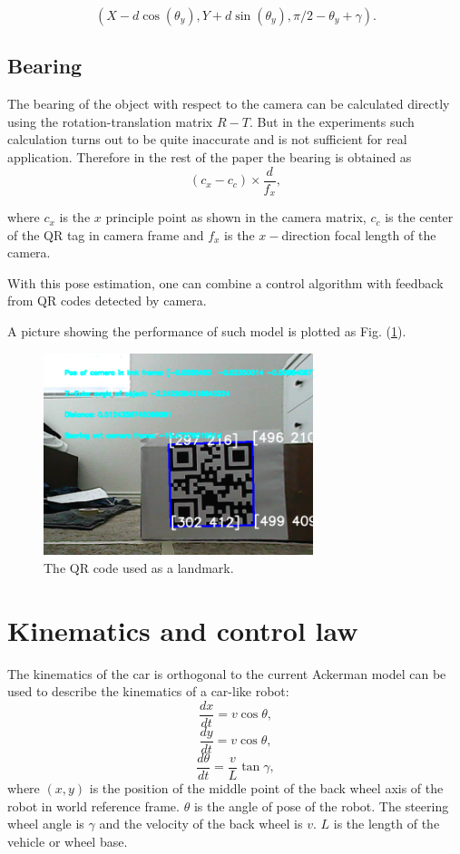 \documentclass[12pt]{article}
\begin{document}
$$(X-d\cos(\theta_y),Y+d\sin(\theta_y),\pi/2-\theta_y+\gamma).$$
\subsection{Bearing}
The bearing of the object with respect to the camera can be calculated directly using the rotation-translation matrix $R-T$. But in the experiments such calculation turns out to be quite inaccurate and is not sufficient for real application. Therefore in the rest of the paper the bearing is obtained as $$(c_x-c_c)\times \frac{d}{f_x},$$

where $c_x$ is the $x$ principle point as shown in the camera matrix, $c_c$ is the center of the QR tag in camera frame and $f_x$ is the $x-$direction focal length of the camera.

With this pose estimation, one can combine a control algorithm with feedback from QR codes detected by camera.

A picture showing the performance of such model is plotted as  Fig. (\ref{QR}).
\begin{figure}[htbp]
\centering
\includegraphics[width=0.7\textwidth]{./bearing_distance.png}
\caption{The QR code used as a landmark.}\label{QR}
\end{figure}
\section{Kinematics and control law}
\label{kine}
The kinematics of the car is orthogonal to the current 
Ackerman model can be used to describe the kinematics of a car-like robot: 
$$\frac{d x}{dt}=v\cos \theta,$$
$$\frac{d y}{dt}=v\cos \theta,$$
$$\frac{d \theta}{dt}=\frac{v}{L}\tan \gamma,$$
where $(x,y)$ is the position of the middle point of the back wheel axis of the robot in world reference frame. $\theta$ is the angle of pose of the robot. The steering wheel angle is $\gamma$ and the velocity of the back wheel is $v$. $L$ is the length of the vehicle or wheel base.
\end{document}

